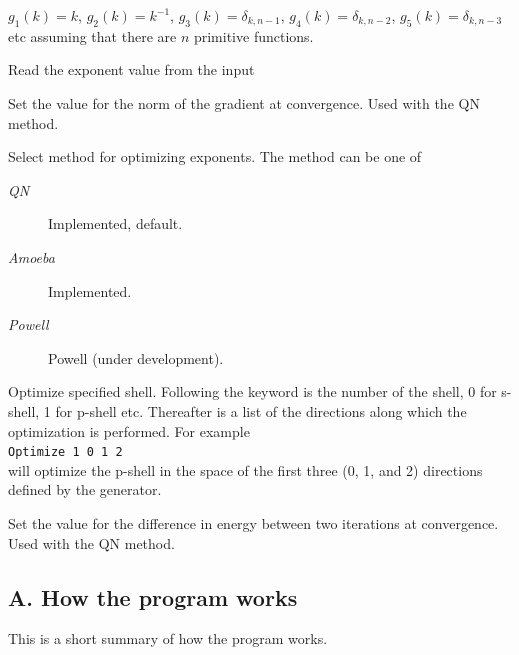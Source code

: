 \documentclass[a4paper,fleqn]{article}
\let\headi=\subsection
\def\kwd#1{{\mdseries\sffamily\slshape\mdseries #1}}
\def\kwditem[#1]{\item[\kwd{#1}]}
\begin{document}
\begin{description}
\begin{description}
      $g_1(k)=k$,
      $g_2(k)=k^{-1}$,
      $g_3(k)=\delta_{k,n-1}$,
      $g_4(k)=\delta_{k,n-2}$,
      $g_5(k)=\delta_{k,n-3}$ etc assuming that there are $n$ primitive functions.
  \kwditem[Exponential] Read the exponent value from the input
  \end{description}
\kwditem[gThreshold]
  Set the value for the norm of the gradient at convergence. Used with the QN method.
\kwditem[Method]
  Select method for optimizing exponents.
  The method can be one of
  \begin{description}
  \kwditem[QN] Implemented, default.
  \kwditem[Amoeba] Implemented.
  \kwditem[Powell] Powell (under development).
  \end{description}
\kwditem[Optimize]
  Optimize specified shell. Following the keyword is the number of the shell, 0 for s-shell, 1 for p-shell etc.
  Thereafter is a list of the directions along which the optimization is performed.
  For example\\
  \verb+Optimize 1 0 1 2+\\
  will optimize the p-shell in the space of the first three (0, 1, and 2) directions
  defined by the generator.
\kwditem[OptimizeWithDirections] 
\kwditem[Penalty] 
\kwditem[Print] 
\kwditem[SelectShell] 
\kwditem[PrintRaw] 
\kwditem[Step] 
\kwditem[Threshold] 
  Set the value for the difference in energy between two iterations at convergence.
  Used with the QN method.
\end{description}
\headi{A. How the program works}
This is a short summary of how the program works.
\end{document}
